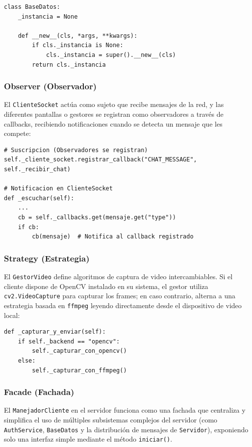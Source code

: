 \documentclass[12pt,a4paper]{article}
\begin{document}
\begin{lstlisting}
class BaseDatos:
    _instancia = None

    def __new__(cls, *args, **kwargs):
        if cls._instancia is None:
            cls._instancia = super().__new__(cls)
        return cls._instancia
\end{lstlisting}

\subsubsection{Observer (Observador)}
El \texttt{ClienteSocket} act\'ua como sujeto que recibe mensajes de la red, y las diferentes pantallas o gestores se registran como observadores a trav\'es de callbacks, recibiendo notificaciones cuando se detecta un mensaje que les compete:

\begin{lstlisting}
# Suscripcion (Observadores se registran)
self._cliente_socket.registrar_callback("CHAT_MESSAGE", self._recibir_chat)

# Notificacion en ClienteSocket
def _escuchar(self):
    ...
    cb = self._callbacks.get(mensaje.get("type"))
    if cb:
        cb(mensaje)  # Notifica al callback registrado
\end{lstlisting}

\subsubsection{Strategy (Estrategia)}
El \texttt{GestorVideo} define algoritmos de captura de video intercambiables. Si el cliente dispone de OpenCV instalado en su sistema, el gestor utiliza \texttt{cv2.VideoCapture} para capturar los frames; en caso contrario, alterna a una estrategia basada en \texttt{ffmpeg} leyendo directamente desde el dispositivo de video local:

\begin{lstlisting}
def _capturar_y_enviar(self):
    if self._backend == "opencv":
        self._capturar_con_opencv()
    else:
        self._capturar_con_ffmpeg()
\end{lstlisting}

\subsubsection{Facade (Fachada)}
El \texttt{ManejadorCliente} en el servidor funciona como una fachada que centraliza y simplifica el uso de m\'ultiples subsistemas complejos del servidor (como \texttt{AuthService}, \texttt{BaseDatos} y la distribuci\'on de mensajes de \texttt{Servidor}), exponiendo solo una interfaz simple mediante el m\'etodo \texttt{iniciar()}.
\end{document}
